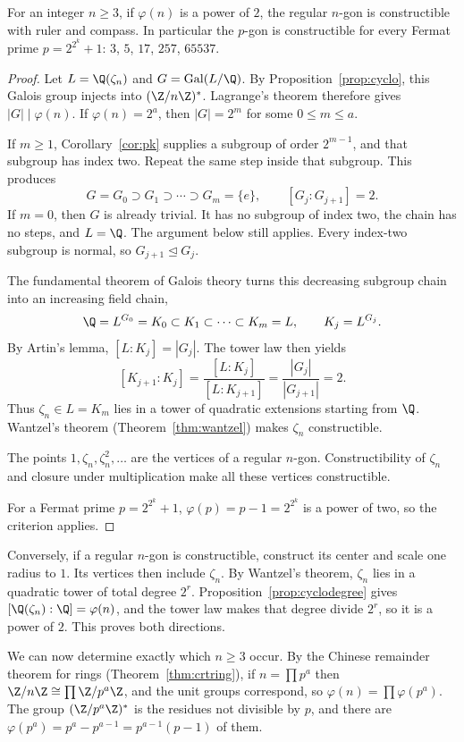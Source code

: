 \begin{theorem}\label{thm:gw}
For an integer $n\ge3$, if $\varphi(n)$ is a power of $2$, the regular $n$-gon is constructible with ruler and compass. In particular the $p$-gon is constructible for every Fermat prime $p=2^{2^k}+1$: $3$, $5$, $17$, $257$, $65537$.
\end{theorem}
\begin{proof}
Let $L=\Q(\zeta_n)$ and
$G=\operatorname{Gal}(L/\Q)$.
By Proposition~\ref{prop:cyclo}, this Galois
group injects into $(\Z/n\Z)^*$.
Lagrange's theorem therefore gives
$|G|\mid\varphi(n)$.
If $\varphi(n)=2^a$, then $|G|=2^m$
for some $0\le m\le a$.

If $m\ge1$, Corollary~\ref{cor:pk} supplies a subgroup
of order $2^{m-1}$, and that subgroup has index two.
Repeat the same step inside that subgroup. This produces
\[
G=G_0\supset G_1\supset\cdots
\supset G_m=\{e\},\qquad
[G_j:G_{j+1}]=2.
\]
If $m=0$, then $G$ is already trivial. It has no subgroup of index two, the chain has no steps, and $L=\Q$. The argument below still applies.
Every index-two subgroup is normal,
so $G_{j+1}\trianglelefteq G_j$.

The fundamental theorem of Galois theory
turns this decreasing subgroup chain
into an increasing field chain,
\[
\Q=L^{G_0}=K_0\subset K_1
\subset\cdots\subset K_m=L,
\qquad K_j=L^{G_j}.
\]
By Artin's lemma,
$[L:K_j]=|G_j|$. The tower law then yields
\[
[K_{j+1}:K_j]
=\frac{[L:K_j]}{[L:K_{j+1}]}
=\frac{|G_j|}{|G_{j+1}|}=2.
\]
Thus $\zeta_n\in L=K_m$ lies in a tower
of quadratic extensions starting from $\Q$.
Wantzel's theorem (Theorem~\ref{thm:wantzel})
makes $\zeta_n$ constructible.

The points $1,\zeta_n,\zeta_n^2,\ldots$
are the vertices of a regular $n$-gon.
Constructibility of $\zeta_n$ and closure
under multiplication make all these
vertices constructible.

For a Fermat prime $p=2^{2^k}+1$,
$\varphi(p)=p-1=2^{2^k}$ is a power of two,
so the criterion applies.
\end{proof}

Conversely, if a regular $n$-gon is constructible, construct its center and scale one radius to $1$. Its vertices then include $\zeta_n$. By Wantzel's theorem, $\zeta_n$ lies in a quadratic tower of total degree $2^r$. Proposition~\ref{prop:cyclodegree} gives $[\Q(\zeta_n):\Q]=\varphi(n)$, and the tower law makes that degree divide $2^r$, so it is a power of $2$. This proves both directions.

We can now determine exactly which $n\ge3$ occur. By the Chinese remainder theorem for rings (Theorem~\ref{thm:crtring}), if $n=\prod p^{a}$ then $\Z/n\Z\cong\prod\Z/p^{a}\Z$, and the unit groups correspond, so $\varphi(n)=\prod\varphi(p^{a})$. The group $(\Z/p^{a}\Z)^*$ is the residues not divisible by $p$, and there are $\varphi(p^{a})=p^{a}-p^{a-1}=p^{a-1}(p-1)$ of them.

